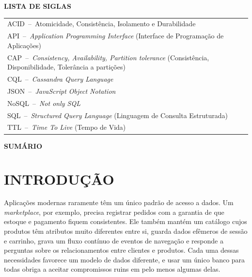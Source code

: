 \documentclass[12pt,a4paper,oneside]{article}
\renewcommand{\headrulewidth}{0pt}
\begin{document}
\newpage\thispagestyle{semnum}
\begin{center}{\bfseries\MakeUppercase{Lista de Siglas}}\end{center}
\vspace{\baselineskip}
\setlength{\tabcolsep}{0pt}
\renewcommand{\arraystretch}{1.0}
\noindent\begin{tabularx}{\textwidth}{@{}X@{}}
ACID~--~Atomicidade, Consistência, Isolamento e Durabilidade\\
API~--~\textit{Application Programming Interface} (Interface de Programação de Aplicações)\\
CAP~--~\textit{Consistency, Availability, Partition tolerance} (Consistência, Disponibilidade, Tolerância a partições)\\
CQL~--~\textit{Cassandra Query Language}\\
JSON~--~\textit{JavaScript Object Notation}\\
NoSQL~--~\textit{Not only SQL}\\
SQL~--~\textit{Structured Query Language} (Linguagem de Consulta Estruturada)\\
TTL~--~\textit{Time To Live} (Tempo de Vida)\\
\end{tabularx}
\setlength{\tabcolsep}{6pt}

\newpage\thispagestyle{semnum}
\begin{center}{\bfseries\MakeUppercase{Sumário}}\end{center}
\vspace{\baselineskip}
\renewcommand{\contentsname}{}
\vspace{-2\baselineskip}
\tableofcontents

\newpage
\addtocounter{page}{-1}
\pagestyle{fancy}
\fancyhf{}
\fancyhead[R]{\thepage}
\renewcommand{\headrulewidth}{0pt}

\section{INTRODUÇÃO}

Aplicações modernas raramente têm um único padrão de acesso a dados. Um \textit{marketplace}, por exemplo, precisa registrar pedidos com a garantia de que estoque e pagamento fiquem consistentes. Ele também mantém um catálogo cujos produtos têm atributos muito diferentes entre si, guarda dados efêmeros de sessão e carrinho, grava um fluxo contínuo de eventos de navegação e responde a perguntas sobre os relacionamentos entre clientes e produtos. Cada uma dessas necessidades favorece um modelo de dados diferente, e usar um único banco para todas obriga a aceitar compromissos ruins em pelo menos algumas delas.
\end{document}
